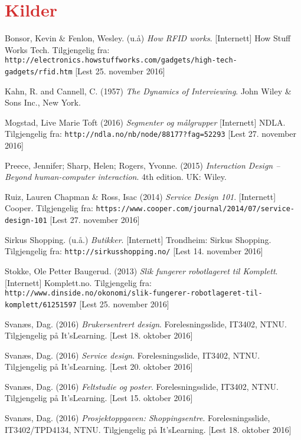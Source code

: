 \section{\textcolor[HTML]{D32F2F}{Kilder}}
\begin{thebibliography}{30}
Bonsor, Kevin \& Fenlon, Wesley. (u.å) \textit{How RFID works}. [Internett] How Stuff Works Tech. Tilgjengelig fra:    \texttt{http://electronics.howstuffworks.com/gadgets/high-tech-gadgets/rfid.htm} [Lest 25. november 2016]

Kahn, R. and Cannell, C. (1957) \textit{The Dynamics of Interviewing}. John Wiley \& Sons Inc., New York.

Mogstad, Live Marie Toft (2016) \textit{Segmenter og målgrupper} [Internett] NDLA. Tilgjengelig fra: \texttt{http://ndla.no/nb/node/88177?fag=52293} [Lest 27. november 2016]

Preece, Jennifer; Sharp, Helen; Rogers, Yvonne. (2015) \textit{Interaction Design – Beyond human-computer interaction}. 4th edition. UK: Wiley.

Ruiz, Lauren Chapman \& Ross, Isac (2014) \textit{Service Design 101}. [Internett] Cooper. Tilgjengelig fra: \texttt{https://www.cooper.com/journal/2014/07/service-design-101} [Lest 27. november 2016]

Sirkus Shopping. (u.å.) \textit{Butikker}. [Internett] Trondheim: Sirkus Shopping. Tilgjengelig fra: \texttt{http://sirkusshopping.no/} [Lest 14. november 2016]

Stokke, Ole Petter Baugerud. (2013) \textit{Slik fungerer robotlageret til Komplett}. [Internett] Komplett.no. Tilgjengelig fra: \\ \texttt{http://www.dinside.no/okonomi/slik-fungerer-robotlageret-til-komplett/61251597} [Lest 25. november 2016]

Svanæs, Dag. (2016) \textit{Brukersentrert design}. Forelesningsslide, IT3402, NTNU. Tilgjengelig på It’sLearning. [Lest 18. oktober 2016]

Svanæs, Dag. (2016) \textit{Service design}. Forelesningsslide, IT3402, NTNU. Tilgjengelig på It’sLearning. [Lest 20. oktober 2016]

Svanæs, Dag. (2016) \textit{Feltstudie og poster}. Forelesningsslide, IT3402, NTNU. Tilgjengelig på It’sLearning. [Lest 15. oktober 2016]

Svanæs, Dag. (2016) \textit{Prosjektoppgaven: Shoppingsentre}. Forelesningsslide, IT3402/TPD4134, NTNU. Tilgjengelig på It’sLearning. [Lest 18. oktober 2016]


\end{thebibliography}
